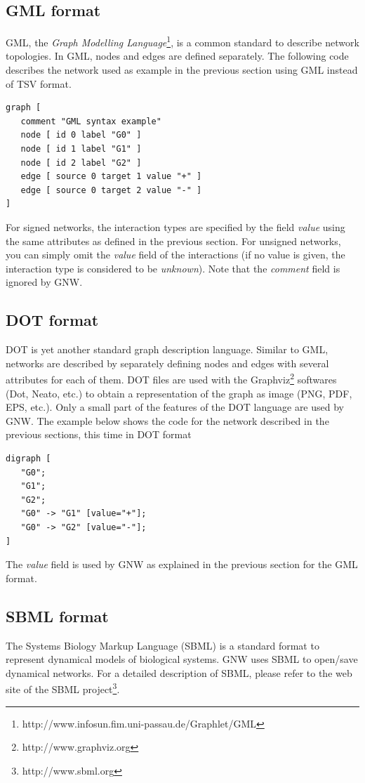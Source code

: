 \documentclass{llncs}
\begin{document}
\subsection{GML format}
GML, the \emph{Graph Modelling Language}\footnote{http://www.infosun.fim.uni-passau.de/Graphlet/GML}, is a common standard to describe network topologies. In GML, nodes and edges are defined separately. The following code describes the network used as example in the previous section using GML instead of TSV format.
\begin{verbatim}
graph [
   comment "GML syntax example"
   node [ id 0 label "G0" ]
   node [ id 1 label "G1" ]
   node [ id 2 label "G2" ]
   edge [ source 0 target 1 value "+" ]
   edge [ source 0 target 2 value "-" ]
]
\end{verbatim}
For signed networks, the interaction types are specified by the field \emph{value} using the same attributes as defined in the previous section. For unsigned networks, you can simply omit the \emph{value} field of the interactions (if no value is given, the interaction type is considered to be \emph{unknown}). Note that the \emph{comment} field is ignored by GNW. 


\subsection{DOT format}
\label{dotformat}
DOT is yet another standard graph description language. Similar to GML, networks are described by separately defining nodes and edges with several attributes for each of them. DOT files are used with the Graphviz\footnote{http://www.graphviz.org} softwares (Dot, Neato, etc.) to obtain a representation of the graph as image (PNG, PDF, EPS, etc.). Only a small part of the features of the DOT language are used by GNW. The example below shows the code for the network described in the previous sections, this time in DOT format
\begin{verbatim}
digraph [
   "G0";
   "G1";
   "G2";
   "G0" -> "G1" [value="+"];
   "G0" -> "G2" [value="-"];
]
\end{verbatim}
The \emph{value} field is used by GNW as explained in the previous section for the GML format.

\subsection{SBML format}
The Systems Biology Markup Language (SBML) is a standard format to represent dynamical models of biological systems. GNW uses SBML to open/save dynamical networks. For a detailed description of SBML, please refer to the web site of the SBML project\footnote{http://www.sbml.org}.\\
\end{document}
